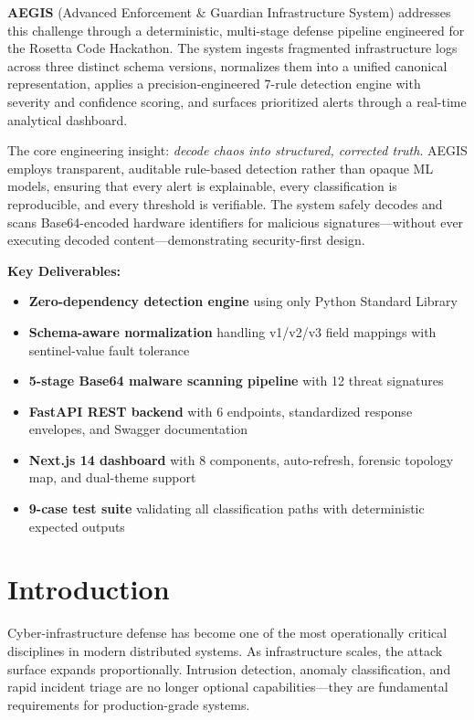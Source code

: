 \documentclass[12pt,a4paper]{article}
\begin{document}
\textbf{AEGIS} (Advanced Enforcement \& Guardian Infrastructure System) addresses this challenge through a deterministic, multi-stage defense pipeline engineered for the Rosetta Code Hackathon. The system ingests fragmented infrastructure logs across three distinct schema versions, normalizes them into a unified canonical representation, applies a precision-engineered 7-rule detection engine with severity and confidence scoring, and surfaces prioritized alerts through a real-time analytical dashboard.

The core engineering insight: \textit{decode chaos into structured, corrected truth}. AEGIS employs transparent, auditable rule-based detection rather than opaque ML models, ensuring that every alert is explainable, every classification is reproducible, and every threshold is verifiable. The system safely decodes and scans Base64-encoded hardware identifiers for malicious signatures---without ever executing decoded content---demonstrating security-first design.

\textbf{Key Deliverables:}
\begin{itemize}[noitemsep]
    \item \textbf{Zero-dependency detection engine} using only Python Standard Library
    \item \textbf{Schema-aware normalization} handling v1/v2/v3 field mappings with sentinel-value fault tolerance
    \item \textbf{5-stage Base64 malware scanning pipeline} with 12 threat signatures
    \item \textbf{FastAPI REST backend} with 6 endpoints, standardized response envelopes, and Swagger documentation
    \item \textbf{Next.js 14 dashboard} with 8 components, auto-refresh, forensic topology map, and dual-theme support
    \item \textbf{9-case test suite} validating all classification paths with deterministic expected outputs
\end{itemize}

\section{Introduction}

Cyber-infrastructure defense has become one of the most operationally critical disciplines in modern distributed systems. As infrastructure scales, the attack surface expands proportionally. Intrusion detection, anomaly classification, and rapid incident triage are no longer optional capabilities---they are fundamental requirements for production-grade systems.
\end{document}
